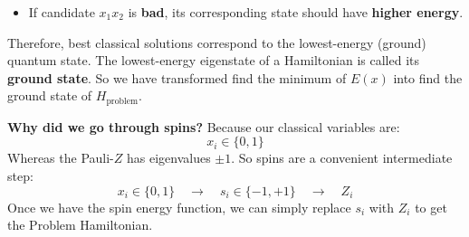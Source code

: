 \begin{deepeningbox}
\begin{itemize}
        \item[\textcolor{Red2}{\faIcon{times}}] If candidate $x_1 x_2$ is \textbf{bad}, its corresponding state should have \textbf{higher energy}.
    \end{itemize}
    Therefore, best classical solutions correspond to the lowest-energy (ground) quantum state. The lowest-energy eigenstate of a Hamiltonian is called its \textbf{ground state}. So we have transformed find the minimum of $E(x)$ into find the ground state of $H_{\text{problem}}$.

    \highspace
    \textcolor{Green3}{ \textbf{Why did we go through spins?}} Because our classical variables are:
    \begin{equation*}
        x_i \in \{0,1\}
    \end{equation*}
    Whereas the Pauli-$Z$ has eigenvalues $\pm 1$. So spins are a convenient intermediate step:
    \begin{equation*}
        x_i \in \{0,1\} \quad \to \quad s_i \in \{-1,+1\} \quad \to \quad Z_i
    \end{equation*}
    Once we have the spin energy function, we can simply replace $s_i$ with $Z_i$ to get the Problem Hamiltonian.


\end{deepeningbox}
